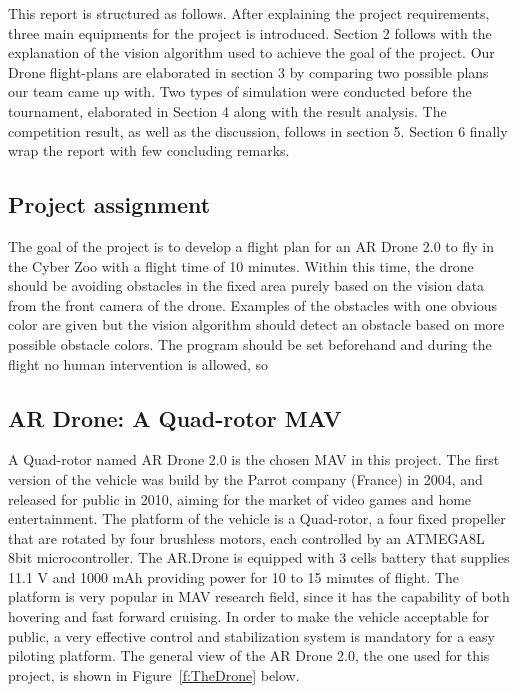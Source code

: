 This report is structured as follows. After explaining the project requirements, three main equipments for the project is introduced. Section 2 follows with the explanation of the vision algorithm used to achieve the goal of the project. Our Drone flight-plans are elaborated in section 3 by comparing two possible plans our team came up with. Two types of simulation were conducted before the tournament, elaborated in Section 4 along with the result analysis. The competition result, as well as the discussion, follows in section 5. Section 6 finally wrap the report with few concluding remarks.

\subsection{Project assignment}
The goal of the project is to develop a flight plan for an AR Drone 2.0 to fly in the Cyber Zoo with a flight time of 10 minutes. Within this time, the drone should be avoiding obstacles in the fixed area purely based on the vision data from the front camera of the drone. Examples of the obstacles with one obvious color are given but the vision algorithm should detect an obstacle based on more possible obstacle colors. The program should be set beforehand and during the flight no human intervention is allowed, so 

\subsection{AR Drone: A Quad-rotor MAV}
A Quad-rotor named AR Drone 2.0 is the chosen MAV in this project. The first version of the vehicle was build by the Parrot company (France) in 2004, and released for public in 2010, aiming for the market of video games and home entertainment\cite{Bristeau:11}. The platform of the vehicle is a Quad-rotor, a four fixed propeller that are rotated by four brushless motors, each controlled by an ATMEGA8L 8bit microcontroller. The AR.Drone is equipped with 3 cells battery that supplies 11.1 V and 1000 mAh providing power for 10 to 15 minutes of flight. The platform is very popular in MAV research field\cite{Bristeau:11}\cite{Pestana:13}\cite{Lugo:14}, since it has the capability of both hovering and fast forward cruising. In order to make the vehicle acceptable for public, a very effective control and stabilization system is mandatory for a easy piloting platform. The general view of the AR Drone 2.0, the one used for this project, is shown in Figure~\ref{f:TheDrone} below.

